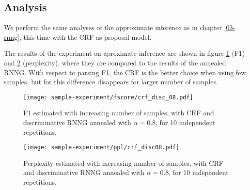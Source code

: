 
  \subsection{Analysis}

    We perform the same analyses of the approximate inference as in chapter \ref{03-rnng}, this time with the CRF as proposal model.

    The results of the experiment on aproximate inference are shown in figure \ref{fig:samples-fscores} (F1) and \ref{fig:samples-perplexities} (perplexity), where they are compared to the results of the annealed RNNG. With respect to parsing F1, the CRF is the better choice when using few samples, but for this difference disappears for larger number of samples.

    \begin{figure}[h]
      \center
    	\texttt{[image: sample-experiment/fscore/crf\_disc\_08.pdf]}
    \caption{F1 estimated with increasing number of samples, with CRF and discriminative RNNG annealed with $\alpha=0.8$, for 10 independent repetitions.}
    \label{fig:samples-fscores}
    \end{figure}

    \begin{figure}[h]
      \center
    	\texttt{[image: sample-experiment/ppl/crf\_disc08.pdf]}
    \caption{Perplexity estimated with increasing number of samples, with CRF and discriminative RNNG annealed with $\alpha=0.8$, for 10 independent repetitions.}
    \label{fig:samples-perplexities}
    \end{figure}

